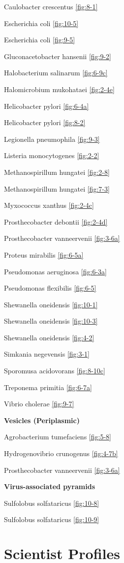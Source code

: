 \documentclass[]{tufte-book}
\begin{document}
Caulobacter crescentus \ref{fig:8-1}

Escherichia coli \ref{fig:10-5}

Escherichia coli \ref{fig:9-5}

Gluconacetobacter hansenii \ref{fig:9-2}

Halobacterium salinarum \ref{fig:6-9c}

Halomicrobium mukohataei \ref{fig:2-4e}

Helicobacter pylori \ref{fig:6-4a}

Helicobacter pylori \ref{fig:8-2}

Legionella pneumophila \ref{fig:9-3}

Listeria monocytogenes \ref{fig:2-2}

Methanospirillum hungatei \ref{fig:2-8}

Methanospirillum hungatei \ref{fig:7-3}

Myxococcus xanthus \ref{fig:2-4c}

Prosthecobacter debontii \ref{fig:2-4d}

Prosthecobacter vanneervenii \ref{fig:3-6a}

Proteus mirabilis \ref{fig:6-5a}

Pseudomonas aeruginosa \ref{fig:6-3a}

Pseudomonas flexibilis \ref{fig:6-5}

Shewanella oneidensis \ref{fig:10-1}

Shewanella oneidensis \ref{fig:10-3}

Shewanella oneidensis \ref{fig:4-2}

Simkania negevensis \ref{fig:3-1}

Sporomusa acidovorans \ref{fig:8-10c}

Treponema primitia \ref{fig:6-7a}

Vibrio cholerae \ref{fig:9-7}

\textbf{Vesicles (Periplasmic)}

Agrobacterium tumefaciens \ref{fig:5-8}

Hydrogenovibrio crunogenus \ref{fig:4-7b}

Prosthecobacter vanneervenii \ref{fig:3-6a}

\textbf{Virus-associated pyramids}

Sulfolobus solfataricus \ref{fig:10-8}

Sulfolobus solfataricus \ref{fig:10-9}

\chapter{Scientist Profiles}\label{scientist-profiles}
\end{document}
